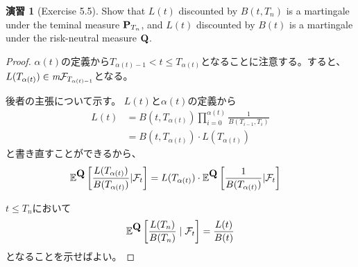 \documentclass[11pt]{jarticle}
\newcommand{\0}{\mbox{\boldmath $0$}}
\newcommand{\1}{\mbox{\boldmath \large$1$}}
\renewcommand{\P}{\mbox{\textbf{P}}}			%
\newcommand{\Q}{\mbox{\textbf{Q}}}			%
\newcommand{\E}{\mbox{$\mathbb{E}$}}			%
\theoremstyle{definition}
\newtheorem{Exer}{演習}[section]
\begin{document}
\begin{Exer}[Exercise 5.5]
Show that $L(t)$ discounted by $B(t,T_n)$ is a martingale under the teminal measure $\P_{T_n}$, and $L(t)$ discounted by $B(t)$ is a martingale under the risk-neutral measure $\Q$.
\begin{proof}
$\alpha(t)$の定義から$T_{\alpha(t)-1}<t\leq T_{\alpha(t)}$となることに注意する。すると、$L(T_{\alpha(t)}) \in \textit{m}{\cal F}_{T_{\alpha(t)-1}}$となる。

後者の主張について示す。
$L(t)$と$\alpha(t)$の定義から
\begin{align*}
L(t)
&= B(t,T_{\alpha(t)}) \prod_{i=0}^{\alpha(t)} \frac{1}{B(T_{i-1},T_i)}\\
&= B(t,T_{\alpha(t)}) \cdot L(T_{\alpha(t)})
\end{align*}
と書き直すことができるから、
\begin{align*}
\E^{\Q} \left[ \frac{L(T_{\alpha(t)})}{B(T_{\alpha(t)})} | \calF_t \right] 
&= L(T_{\alpha(t)}) \cdot \E^{\Q} \left[ \frac{1}{B(T_{\alpha(t)})} | \calF_t \right]
\end{align*}

$t\leq T_n$において
$$\E^{\Q} \left[ \frac{L(T_n)}{B(T_n)} \mid \calF_t \right] = \frac{L(t)}{B(t)} $$
となることを示せばよい。
\end{proof}
\end{Exer}
\end{document}
